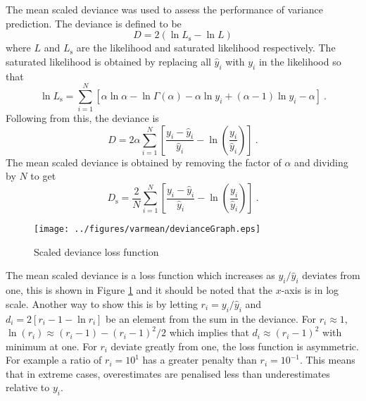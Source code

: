 The mean scaled deviance was used to assess the performance of variance prediction. The deviance is defined to be
\begin{equation}
  D = 2\left(
    \ln L_\mathrm{s} - \ln L    
  \right)
\end{equation}
where $L$ and $L_\mathrm{s}$ are the likelihood and saturated likelihood respectively.  The saturated likelihood is obtained by replacing all $\widehat{y}_i$ with $y_i$ in the likelihood so that
\begin{equation}
  \ln L_\mathrm{s} = \sum_{i=1}^N \left[
    \alpha\ln\alpha
    -\ln\Gamma(\alpha)
    -\alpha\ln{y_i}
    +(\alpha-1)\ln y_i
    -\alpha
  \right]
  \ .
\end{equation}
Following from this, the deviance is
\begin{equation}
  D = 2\alpha
  \sum_{i=1}^N\left[
      \dfrac{
          y_i-\widehat{y}_i
      }
      {
          \widehat{y}_i
      }
      - \ln\left(\dfrac{y_i}{\widehat{y}_i}\right)
  \right]
  \ .
\end{equation}
The mean scaled deviance is obtained by removing the factor of $\alpha$ and dividing by $N$ to get
\begin{equation}
    D_\mathrm{s} = \dfrac{2}{N}
    \sum_{i=1}^N\left[
        \dfrac{
            y_i-\widehat{y}_i
        }
        {
            \widehat{y}_i
        }
        - \ln\left(\dfrac{y_i}{\widehat{y}_i}\right)
    \right]
    \ .
\end{equation}

\begin{figure}
  \centering
  \texttt{[image: ../figures/varmean/devianceGraph.eps]}
  \caption{Scaled deviance loss function}
  \label{fig:meanVar_deviance}
\end{figure}

The mean scaled deviance is a loss function which increases as $y_i/\widehat{y}_i$ deviates from one, this is shown in Figure \ref{fig:meanVar_deviance} and it should be noted that the $x$-axis is in log scale. Another way to show this is by letting $r_i = y_i/\widehat{y}_i$ and $d_i = 2\left[r_i-1-\ln r_i\right]$ be an element from the sum in the deviance. For $r_i\approx 1$, $\ln(r_i)\approx(r_i-1)-(r_i-1)^2/2$ which implies that $d_i\approx (r_i-1)^2$ with minimum at one. For $r_i$ deviate greatly from one, the loss function is asymmetric. For example a ratio of $r_i=10^1$ has a greater penalty than $r_i=10^{-1}$. This means that in extreme cases, overestimates are penalised less than underestimates relative to $y_i$. 

